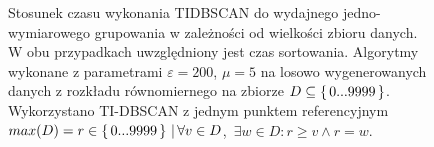 \begin{figure}
	\centering
  \caption{Stosunek czasu wykonania TIDBSCAN do wydajnego jedno-wymiarowego grupowania w zależności od wielkości zbioru danych. W obu przypadkach uwzględniony jest czas sortowania. Algorytmy wykonane z parametrami $ \varepsilon=200 $, $ \mu=5 $ na losowo wygenerowanych danych z rozkładu równomiernego na zbiorze \mbox{$ D \subseteq \set{ 0...9999 } $}. Wykorzystano TI-DBSCAN z jednym punktem referencyjnym \mbox{$ max(D) = r \in \set{ 0...9999 } \,|\, \forall v \in D$, $\exists w \in D : r \ge v \land r = w$.}}\label{odc:odc-vs-dbscan-ratio}
\end{figure}